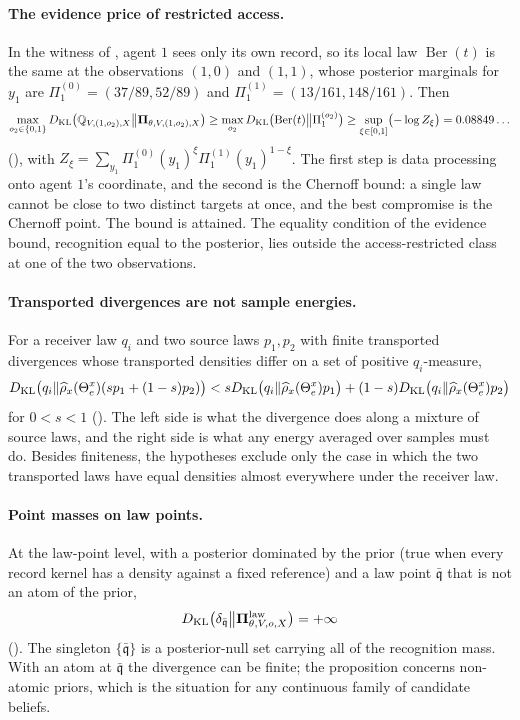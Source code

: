 \paragraph{The evidence price of restricted access.}
In the witness of , agent $1$ sees only its own record, so its local law
$\operatorname{Ber}(t)$ is the same at the observations $(1,0)$ and $(1,1)$, whose posterior marginals for $y_1$
are $\Pi_1^{(0)}=(37/89,52/89)$ and $\Pi_1^{(1)}=(13/161,148/161)$. Then
\[
\max_{o_2\in\{0,1\}}D_{\mathrm{KL}}\bigl(\mathbb Q_{V,(1,o_2),X}\big\Vert\boldsymbol\Pi_{\theta,V,(1,o_2),X}\bigr)
\geq\max_{o_2}D_{\mathrm{KL}}\bigl(\operatorname{Ber}(t)\big\Vert\Pi_1^{(o_2)}\bigr)
\geq\sup_{\xi\in[0,1]}\bigl(-\log Z_\xi\bigr)=0.08849\ldots
\]
(), with $Z_\xi=\sum_{y_1}\Pi_1^{(0)}(y_1)^\xi\Pi_1^{(1)}(y_1)^{1-\xi}$. The first
step is data processing onto agent $1$'s coordinate, and the second is the Chernoff bound: a single law cannot
be close to two distinct targets at once, and the best compromise is the Chernoff point. The bound is attained.
The equality condition of the evidence bound, recognition equal to the posterior, lies outside the
access-restricted class at one of the two observations.

\paragraph{Transported divergences are not sample energies.}
For a receiver law $q_i$ and two source laws $p_1,p_2$ with finite transported divergences whose transported
densities differ on a set of positive $q_i$-measure,
\[
D_{\mathrm{KL}}\bigl(q_i\Vert\widehat\rho_x(\Theta_e^x)(sp_1+(1-s)p_2)\bigr)
<sD_{\mathrm{KL}}\bigl(q_i\Vert\widehat\rho_x(\Theta_e^x)p_1\bigr)+(1-s)D_{\mathrm{KL}}\bigl(q_i\Vert\widehat\rho_x(\Theta_e^x)p_2\bigr)
\]
for $0<s<1$ (). The left side is what the divergence does along a mixture of
source laws, and the right side is what any energy averaged over samples must do. Besides finiteness, the
hypotheses exclude only the case in which the two transported laws have equal densities almost everywhere under
the receiver law.

\paragraph{Point masses on law points.}
At the law-point level, with a posterior dominated by the prior (true when every record kernel has a density
against a fixed reference) and a law point $\bar{\mathfrak q}$ that is not an atom of the prior,
\[
D_{\mathrm{KL}}\bigl(\delta_{\bar{\mathfrak q}}\big\Vert\boldsymbol\Pi^{\mathrm{law}}_{\theta,V,o,X}\bigr)=+\infty
\]
(). The singleton $\{\bar{\mathfrak q}\}$ is a posterior-null set carrying all of
the recognition mass. With an atom at $\bar{\mathfrak q}$ the divergence can be finite; the proposition concerns
non-atomic priors, which is the situation for any continuous family of candidate beliefs.

